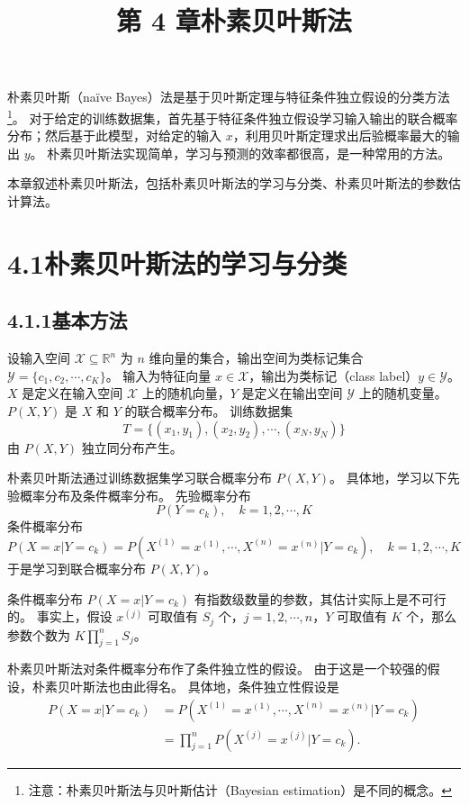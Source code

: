 \documentclass[UTF8,12pt,a4paper,fontset=fandol]{ctexart}
\title{第 4 章\quad 朴素贝叶斯法}
\author{}
\date{}
\begin{document}
\maketitle

朴素贝叶斯（naïve Bayes）法是基于贝叶斯定理与特征条件独立假设的分类方法\footnote{注意：朴素贝叶斯法与贝叶斯估计（Bayesian estimation）是不同的概念。}。
对于给定的训练数据集，首先基于特征条件独立假设学习输入输出的联合概率分布；然后基于此模型，对给定的输入 $x$，利用贝叶斯定理求出后验概率最大的输出 $y$。
朴素贝叶斯法实现简单，学习与预测的效率都很高，是一种常用的方法。

本章叙述朴素贝叶斯法，包括朴素贝叶斯法的学习与分类、朴素贝叶斯法的参数估计算法。

\section*{4.1\quad 朴素贝叶斯法的学习与分类}

\subsection*{4.1.1\quad 基本方法}

设输入空间 $\mathcal{X}\subseteq \mathbb{R}^n$ 为 $n$ 维向量的集合，输出空间为类标记集合 $\mathcal{Y}=\{c_1,c_2,\cdots,c_K\}$。
输入为特征向量 $x\in\mathcal{X}$，输出为类标记（class label）$y\in\mathcal{Y}$。
$X$ 是定义在输入空间 $\mathcal{X}$ 上的随机向量，$Y$ 是定义在输出空间 $\mathcal{Y}$ 上的随机变量。
$P(X,Y)$ 是 $X$ 和 $Y$ 的联合概率分布。
训练数据集
\[
  T=\{(x_1,y_1),(x_2,y_2),\cdots,(x_N,y_N)\}
\]
由 $P(X,Y)$ 独立同分布产生。

朴素贝叶斯法通过训练数据集学习联合概率分布 $P(X,Y)$。
具体地，学习以下先验概率分布及条件概率分布。
先验概率分布
\begin{equation}
  P(Y=c_k),\quad k=1,2,\cdots,K
  \tag{4.1}
\end{equation}
条件概率分布
\begin{equation}
  P(X=x|Y=c_k)=P(X^{(1)}=x^{(1)},\cdots,X^{(n)}=x^{(n)}|Y=c_k),
  \quad k=1,2,\cdots,K
  \tag{4.2}
\end{equation}
于是学习到联合概率分布 $P(X,Y)$。

条件概率分布 $P(X=x|Y=c_k)$ 有指数级数量的参数，其估计实际上是不可行的。
事实上，假设 $x^{(j)}$ 可取值有 $S_j$ 个，$j=1,2,\cdots,n$，$Y$ 可取值有 $K$ 个，那么参数个数为 $K\prod_{j=1}^n S_j$。

朴素贝叶斯法对条件概率分布作了条件独立性的假设。
由于这是一个较强的假设，朴素贝叶斯法也由此得名。
具体地，条件独立性假设是
\begin{equation}
\begin{aligned}
  P(X=x|Y=c_k)
  &=P(X^{(1)}=x^{(1)},\cdots,X^{(n)}=x^{(n)}|Y=c_k) \\
  &=\prod_{j=1}^n P(X^{(j)}=x^{(j)}|Y=c_k).
\end{aligned}
\tag{4.3}
\end{equation}
\end{document}
